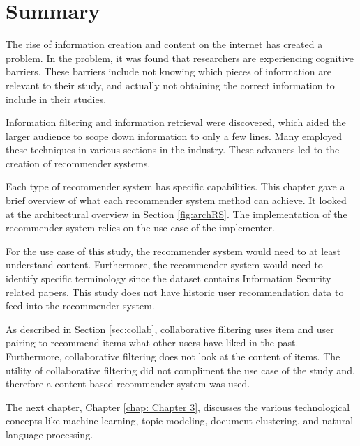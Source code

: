 \section{Summary}
The rise of information creation and content on the internet has created a problem. In the problem, it was found that researchers are experiencing cognitive barriers. These barriers include not knowing which pieces of information are relevant to their study, and actually not obtaining the correct information to include in their studies.

Information filtering and information retrieval were discovered, which aided the larger audience to scope down information to only a few lines. Many employed these techniques in various sections in the industry. These advances led to the creation of recommender systems.

Each type of recommender system has specific capabilities. This chapter gave a brief overview of what each recommender system method can achieve.  It looked at the architectural overview in Section \ref{fig:archRS}. The implementation of the recommender system relies on the use case of the implementer. 

For the use case of this study, the recommender system would need to at least understand content. Furthermore, the recommender system would need to identify specific terminology since the dataset contains Information Security related papers. This study does not have historic user recommendation data to feed into the recommender system. 

As described in Section \ref{sec:collab}, collaborative filtering uses item and user pairing to recommend items what other users have liked in the past. Furthermore, collaborative filtering does not look at the content of items. The utility of collaborative filtering did not compliment the use case of the study and, therefore a content based recommender system was used.

The next chapter, Chapter \ref{chap: Chapter 3}, discusses the various technological concepts like machine learning, topic modeling, document clustering, and natural language processing.



